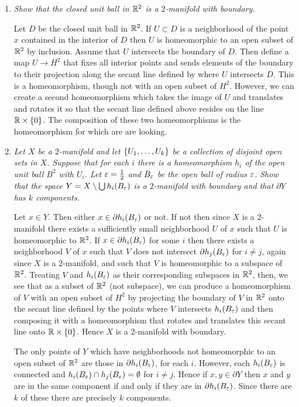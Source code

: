 \documentclass[10pt]{article}
\begin{document}
\begin{enumerate}
\begin{enumerate}
\end{enumerate}

\item \emph{Show that the closed unit ball in $\mathbb{R}^2$ is a $2$-manifold with boundary.}

Let $D$ be the closed unit ball in $\mathbb{R}^2$.  If $U \subset D$ is a neighborhood of the point $x$ contained in the interior of $D$ then $U$ is homeomorphic to an open subset of $\mathbb{R}^2$ by inclusion.  Assume that $U$ intersects the boundary of $D$.  Then define a map $U \rightarrow H^2$ that fixes all interior points and sends elements of the boundary to their projection along the secant line defined by where $U$ intersects $D$.  This is a homeomorphism, though not with an open subset of $H^2$.  However, we can create a second homeomorphism which takes the image of $U$ and translates and rotates it so that the secant line defined above resides on the line $\mathbb{R} \times \left\{ 0 \right\}$.  The composition of these two homeomorphisms is the homeomorphism for which are are looking.

\item \emph{Let $X$ be a $2$-manifold and let $\left\{ U_1, \ldots, U_k \right\}$ be a collection of disjoint open sets in $X$.  Suppose that for each $i$ there is a homeomorphism $h_i$ of the open unit ball $B^2$ with $U_i$.  Let $\varepsilon = \frac{1}{2}$ and $B_\varepsilon$ be the open ball of radius $\varepsilon$.  Show that the space $Y = X \setminus \bigcup h_i(B_\varepsilon)$ is a $2$-manifold with boundary and that $\partial Y$ has $k$ components.}

Let $x \in Y$.  Then either $x \in \partial h_i(B_\varepsilon)$ or not.  If not then since $X$ is a $2$-manifold there exists a sufficiently small neighborhood $U$ of $x$ such that $U$ is homeomorphic to $\mathbb{R}^2$.  If $x \in \partial h_i(B_\varepsilon)$ for some $i$ then there exists a neighborhood $V$ of $x$ such that $V$ does not intersect $\partial h_j(B_\varepsilon)$ for $i \neq j$, again since $X$ is a $2$-manifold, and such that $V$ is homeomorphic to a subspace of $\mathbb{R}^2$.  Treating $V$ and $h_i(B_\varepsilon)$ as their corresponding subspaces in $\mathbb{R}^2$, then, we see that as a subset of $\mathbb{R}^2$ (not subspace), we can produce a homeomorphism of $V$ with an open subset of $H^2$ by projecting the boundary of $V$ in $\mathbb{R}^2$ onto the secant line defined by the points where $V$ intersects $h_i(B_\varepsilon)$ and then composing it with a homeomorphism that rotates and translates this secant line onto $\mathbb{R} \times \left\{ 0 \right\}$.  Hence $X$ is a $2$-manifold with boundary.

The only points of $Y$ which have neighborhoods not homeomorphic to an open subset of $\mathbb{R}^2$ are those in $\partial h_i(B_\varepsilon)$, for each $i$.  However, each $h_i(B_\varepsilon)$ is connected and $h_i(B_\varepsilon) \cap h_j(B_\varepsilon) = \emptyset$ for $i \neq j$.  Hence if $x, y \in \partial Y$ then $x$ and $y$ are in the same component if and only if they are in $\partial h_i(B_\varepsilon)$.  Since there are $k$ of these there are precisely $k$ components.


\end{enumerate}
\end{document}
